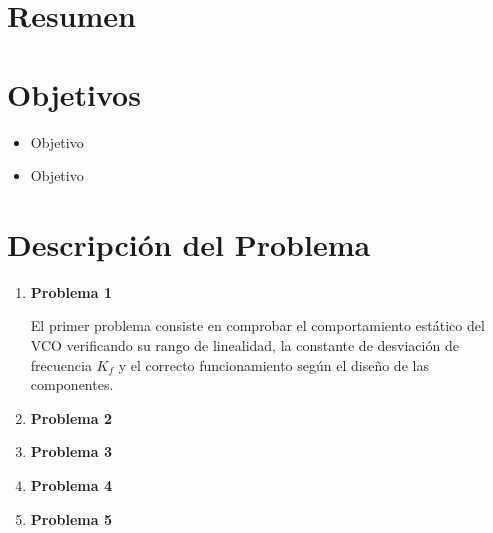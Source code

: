 \documentclass[letterpaper, titlepage]{article}
\begin{document}
\maketitle
\newpage
\section{Resumen}
\section{Objetivos}
	\begin{itemize}
		\item Objetivo
		\item Objetivo
	\end{itemize}
\newpage

\section{Descripción del Problema}
	\begin{enumerate}
		\item \textbf{Problema 1}
		
		El primer problema consiste en comprobar el comportamiento estático del VCO verificando su rango de linealidad, la constante de desviación de frecuencia $K_f$ y el correcto funcionamiento según el diseño de las componentes.
		\item \textbf{Problema 2}
		
		\item \textbf{Problema 3}
		
		\item \textbf{Problema 4}
		
		\item \textbf{Problema 5}
	\end{enumerate}
\newpage
\end{document}
